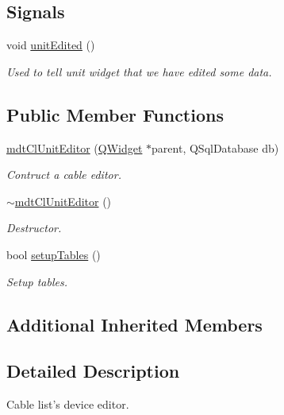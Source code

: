 \subsection*{Signals}
\begin{DoxyCompactItemize}
\item 
void \hyperlink{classmdt_cl_unit_editor_a229445497d158436289db1c87b38009b}{unit\-Edited} ()
\begin{DoxyCompactList}\small\item\em Used to tell unit widget that we have edited some data. \end{DoxyCompactList}\end{DoxyCompactItemize}
\subsection*{Public Member Functions}
\begin{DoxyCompactItemize}
\item 
\hyperlink{classmdt_cl_unit_editor_a996844e2987893ac9958c6832127538e}{mdt\-Cl\-Unit\-Editor} (\hyperlink{class_q_widget}{Q\-Widget} $\ast$parent, Q\-Sql\-Database db)
\begin{DoxyCompactList}\small\item\em Contruct a cable editor. \end{DoxyCompactList}\item 
\hyperlink{classmdt_cl_unit_editor_a63fe328168d8d72b4c09edf9123ae1a1}{$\sim$mdt\-Cl\-Unit\-Editor} ()
\begin{DoxyCompactList}\small\item\em Destructor. \end{DoxyCompactList}\item 
bool \hyperlink{classmdt_cl_unit_editor_a962cfbdda9400a7cf99ba38eec0a4155}{setup\-Tables} ()
\begin{DoxyCompactList}\small\item\em Setup tables. \end{DoxyCompactList}\end{DoxyCompactItemize}
\subsection*{Additional Inherited Members}


\subsection{Detailed Description}
Cable list's device editor. 

